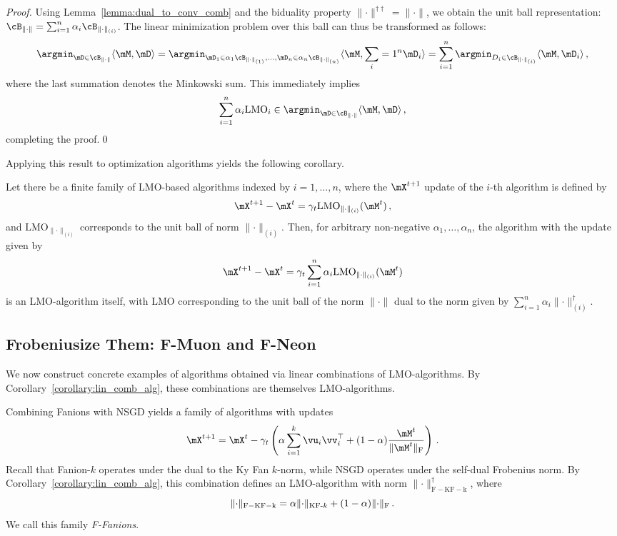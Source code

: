 \documentclass[smallextended,referee,envcountsect]{svjour3}
\newcommand{\norm}[1]{\lVert #1\rVert}
\DeclarePairedDelimiter{\normf}{\|}{\|_\mathrm{F}}
\DeclarePairedDelimiter{\normkfk}{\|}{\|_{\text{KF-}k}}
\def\<#1,#2>{\langle #1,#2\rangle}
\newcommand{\lemmaref}[1]{Lemma~\ref{#1}}
\newcommand{\corollaryref}[1]{Corollary~\ref{#1}}
\begin{document}
 \begin{proof}
   Using \lemmaref{lemma:dual_to_conv_comb} and the biduality property $\norm{\cdot}^{\dagger \dagger} = \norm{\cdot}$, we obtain the unit ball representation: $\cB_{\norm{\cdot}} = \sum_{i = 1}^n \alpha_i \cB_{\norm{\cdot}_{(i)}}$. The linear minimization problem over this ball can thus be transformed as follows:
   \[
   \argmin_{\mD \in \cB_{\norm{\cdot}}}\<\mM, \mD> = \argmin_{\mD_1 \in \alpha_1 \cB_{\norm{\cdot}_{(1)}},\dots,\mD_n \in \alpha_n\cB_{\norm{\cdot}_{(n)}}}\<\mM, \sum_{i = 1}^n\mD_i> = \sum_{i = 1}^n \argmin_{D_i \in \cB_{\norm{\cdot}_{(i)}}}\<\mM, \mD_i>\,,
   \]
   where the last summation denotes the Minkowski sum. This immediately implies 
   \[
   \sum_{i = 1}^n \alpha_i \mathrm{LMO}_{i} \in \argmin_{\mD \in \cB_{\norm{\cdot}}}\<\mM, \mD>\,,
   \] 
   completing the proof.\qed
\end{proof}
 
 Applying this result to optimization algorithms yields the following corollary.
 
 \begin{corollary}\label{corollary:lin_comb_alg}
  Let there be a finite family of LMO-based algorithms indexed by $i = 1, \dots, n$, where the $\mX^{t + 1}$ update of the $i$-th algorithm is defined by
  \[
  \mX^{t + 1} - \mX^{t} = \gamma_t \mathrm{LMO}_{\norm{\cdot}_{(i)}}(\mM^{t})\,,
  \]
  and $\mathrm{LMO}_{\norm{\cdot}_{(i)}}$ corresponds to the unit ball of norm $\norm{\cdot}_{(i)}$. Then, for arbitrary non-negative $\alpha_1, \dots, \alpha_n$, the algorithm with the update given by
  \[
  \mX^{t + 1} - \mX^{t} = \gamma_t \sum_{i = 1}^n \alpha_i \mathrm{LMO}_{\norm{\cdot}_{(i)}}(\mM^t)
  \]
  is an LMO-algorithm itself, with LMO corresponding to the unit ball of the norm $\norm{\cdot}$ dual to the norm given by $\sum_{i = 1}^n \alpha_i \norm{\cdot}_{(i)}^\dagger$.
\end{corollary}
 
 \subsection{Frobeniusize Them: F-Muon and F-Neon}
 We now construct concrete examples of algorithms obtained via linear combinations of LMO-algorithms. By \corollaryref{corollary:lin_comb_alg}, these combinations are themselves LMO-algorithms.
 
 Combining Fanions with NSGD yields a family of algorithms with updates
 \begin{equation}\label{eq:nsgd_muon_update}
     \mX^{t+1} = \mX^{t} - \gamma_t \left(\alpha \sum_{i = 1}^k \vu_i \vv_i^\top + (1-\alpha)\frac{\mM^t}{\normf{\mM^t}}\right)\,.
 \end{equation}
 Recall that Fanion-$k$ operates under the dual to the Ky Fan $k$-norm, while NSGD operates under the self-dual Frobenius norm. By \corollaryref{corollary:lin_comb_alg}, this combination defines an LMO-algorithm with norm $\norm{\cdot}_{\mathrm{F-KF-k}}^\dagger$, where
 \begin{equation}\label{eq:fkfk_norm}
   \norm{\cdot}_{\mathrm{F-KF-k}} = \alpha \normkfk{\cdot} + (1-\alpha)\normf{\cdot}\,.
 \end{equation}
 We call this family \emph{F-Fanions}.
 
\end{document}
